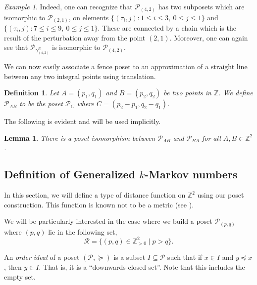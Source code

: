 \documentclass{article}
\newtheorem{definition}[theorem]{Definition}
\newtheorem{lemma}[theorem]{Lemma}
\theoremstyle{remark}
\newtheorem{example}[theorem]{Example}
\newcommand{\calP}{\mathcal{P}}
\begin{document}
\begin{example}
Indeed, one can recognize that $\calP_{(4,2)}$ has two subposets which are isomorphic to $\calP_{(2,1)}$, on elements $\{(\tau_i,j):1 \leq i \leq 3, ~0 \leq j \leq 1\}$ and $\{(\tau_i,j):7 \leq i \leq 9,~ 0 \leq j \leq 1\}$. These are connected by a chain which is the result of the perturbation away from the point $(2,1)$. Moreover, one can again see that $\calP_{\gamma_{(4,2)}^R}$ is isomorphic to $\calP_{(4,2)}$. 
\end{example}

We can now easily associate a fence poset to an approximation of a straight line between any two integral points using translation.

\begin{definition}\label{def:PosetBetweenAnyTwoPoints}
Let $A = (p_1,q_1)$ and $B = (p_2,q_2)$ be two points in $\mathbb{Z}$. We define $\calP_{AB}$ to be the poset $\calP_C$ where $C = (p_2-p_1,q_2-q_1)$.
\end{definition}

The following is evident and will be used implicitly.

\begin{lemma}\label{lem:SwapAandB}
There is a poset isomorphism between $\calP_{AB}$ and $\calP_{BA}$ for all $A,B \in \mathbb{Z}^2$.   
\end{lemma}

\subsection{Definition of Generalized $k$-Markov numbers}\label{sec:Definition}

In this section, we will define a type of distance function on $\mathbb{Z}^2$ using our poset construction. This function is known not to be a metric (see \cite[Remark 3.7]{LLRS}). 

We will be particularly interested in the case where we build a poset $\calP_{(p,q)}$ where $(p,q)$ lie in the following set, 
\begin{equation}
   \mathcal R=\{(p,q)\in \mathbb Z_{>0}^2\mid p>q\}.
\end{equation}



An \emph{order ideal} of a poset $(\calP,\succeq)$ is a subset $I \subseteq \calP$ such that if $x \in I$ and $y \preceq x$, then $y \in I$. That is, it is a ``downwards closed set''. Note that this includes the empty set. 
\end{document}
